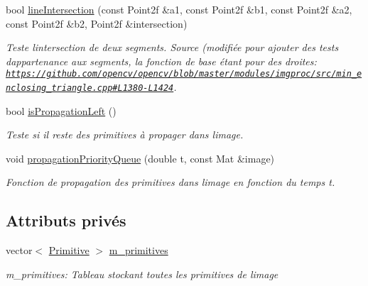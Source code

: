 \begin{DoxyCompactItemize}
bool \hyperlink{classKippi_afb3a6de2afb50deea4f782fecdb63c6a}{line\+Intersection} (const Point2f \&a1, const Point2f \&b1, const Point2f \&a2, const Point2f \&b2, Point2f \&intersection)
\begin{DoxyCompactList}\small\item\em Teste l\textquotesingle{}intersection de deux segments. Source (modifiée pour ajouter des tests d\textquotesingle{}appartenance aux segments, la fonction de base étant pour des droites\+: \href{https://github.com/opencv/opencv/blob/master/modules/imgproc/src/min_enclosing_triangle.cpp#L1380-L1424}{\tt https\+://github.\+com/opencv/opencv/blob/master/modules/imgproc/src/min\+\_\+enclosing\+\_\+triangle.\+cpp\#\+L1380-\/\+L1424}. \end{DoxyCompactList}\item 
\mbox{\label{classKippi_a2cdc0fdc3106ccb21a6bd33790920497}} 
bool \hyperlink{classKippi_a2cdc0fdc3106ccb21a6bd33790920497}{is\+Propagation\+Left} ()
\begin{DoxyCompactList}\small\item\em Teste si il reste des primitives à propager dans l\textquotesingle{}image. \end{DoxyCompactList}\item 
void \hyperlink{classKippi_ac474c09621760386d61b9ee4714512b0}{propagation\+Priority\+Queue} (double t, const Mat \&image)
\begin{DoxyCompactList}\small\item\em Fonction de propagation des primitives dans l\textquotesingle{}image en fonction du temps t. \end{DoxyCompactList}\end{DoxyCompactItemize}
\subsection*{Attributs privés}
\begin{DoxyCompactItemize}
\item 
\mbox{\label{classKippi_a27b6bb80d6de150819bdf84a68f5a649}} 
vector$<$ \hyperlink{classPrimitive}{Primitive} $>$ \hyperlink{classKippi_a27b6bb80d6de150819bdf84a68f5a649}{m\+\_\+primitives}
\begin{DoxyCompactList}\small\item\em m\+\_\+primitives\+: Tableau stockant toutes les primitives de l\textquotesingle{}image \end{DoxyCompactList}\end{DoxyCompactItemize}


